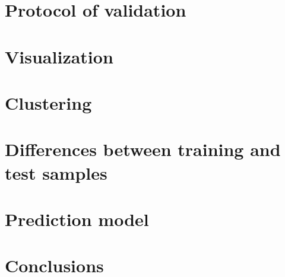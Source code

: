 
\section{Protocol of validation}

\section{Visualization}

\section{Clustering}

\section{Differences between training and test samples}

\section{Prediction model}

\section{Conclusions}


